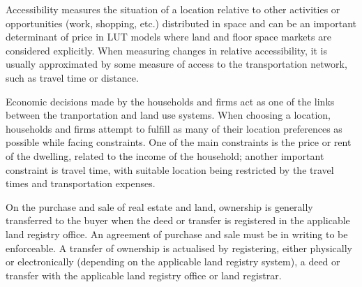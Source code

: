 Accessibility measures the situation of a location relative to other activities or opportunities (work, shopping, etc.) distributed in space and can be an important determinant of price in LUT models where land and floor space markets are considered explicitly\cite{Iacono2008}.
When measuring changes in relative accessibility, it is usually approximated by some measure of access to the transportation network, such as travel time or distance.

Economic decisions made by the households and firms act as one of the links between the tranportation and land use systems.
When choosing a location, households and firms attempt to fulfill as many of their location preferences as possible while facing constraints.
One of the main constraints is the price or rent of the dwelling, related to the income of the household;
another important constraint is travel time, with suitable location being restricted by the travel times and transportation expenses\cite{Moeckel2017}.

On the purchase and sale of real estate and land, ownership is generally transferred to the buyer when the deed or transfer is registered in the applicable land registry office.
An agreement of purchase and sale must be in writing to be enforceable.
A transfer of ownership is actualised by registering, either physically or electronically (depending on the applicable land registry system), a deed or transfer with the applicable land registry office or land registrar.
